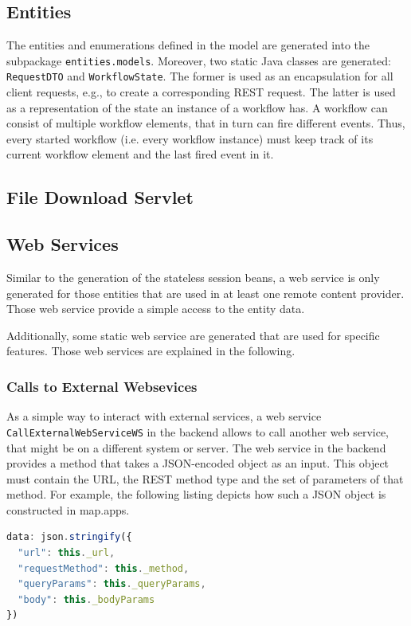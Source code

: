 \subsection{Entities}
The entities and enumerations defined in the \MD model are generated into the subpackage \lstinline|entities.models|. Moreover, two static Java classes are generated:  \lstinline|RequestDTO| and \lstinline|WorkflowState|. The former is used as an encapsulation for all client requests, e.g., to create a corresponding REST request. The latter is used as a representation of the state an instance of a workflow has. A workflow can consist of multiple workflow elements, that in turn can fire different events. Thus, every started workflow (i.e. every workflow instance) must keep track of its current workflow element and the last fired event in it.

\subsection{File Download Servlet}

\subsection{Web Services}
Similar to the generation of the stateless session beans, a web service is only generated for those entities that are used in at least one remote content provider. Those web service provide a simple access to the entity data.

Additionally, some static web service are generated that are used for specific features. Those web services are explained in the following.
\subsubsection{Calls to External Websevices}
As a simple way to interact with external services, a web service \lstinline|CallExternalWebServiceWS| in the backend allows to call another web service, that might be on a different system or server. The web service in the backend provides a method that takes a JSON-encoded object as an input. This object must contain the URL, the REST method type and the set of parameters of that method. For example, the following listing depicts how such a JSON object is constructed in map.apps.

\begin{lstlisting}[language=Javascript, label=lst:callExtWSJSON, caption=JSON-encoded object containing information to call an external web service]
data: json.stringify({
  "url": this._url,
  "requestMethod": this._method,
  "queryParams": this._queryParams,
  "body": this._bodyParams
})
\end{lstlisting}

